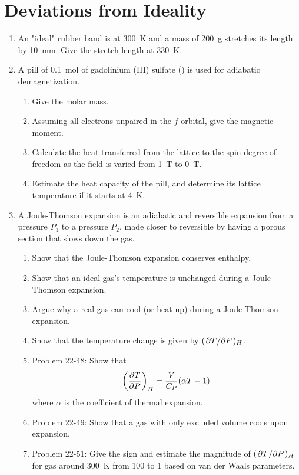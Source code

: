 \documentclass[../psets.tex]{subfiles}
\begin{document}
\section{Deviations from Ideality}
\begin{enumerate}
    \item {}An "ideal" rubber band is at \SI{300}{\kelvin} and a mass of \SI{200}{\gram} stretches its length by \SI{10}{\milli\meter}. Give the stretch length at \SI{330}{\kelvin}.
    \item A pill of \SI{0.1}{\mole} of gadolinium (III) sulfate () is used for adiabatic demagnetization.
    \begin{enumerate}
        \item Give the molar mass.
        \item Assuming all electrons unpaired in the $f$ orbital, give the magnetic moment.
        \item Calculate the heat transferred from the lattice to the spin degree of freedom as the field is varied from \SI{1}{\tesla} to \SI{0}{\tesla}.
        \item Estimate the heat capacity of the pill, and determine its lattice temperature if it starts at \SI{4}{\kelvin}.
    \end{enumerate}
    \item A Joule-Thomson expansion is an adiabatic and reversible expansion from a pressure $P_1$ to a pressure $P_2$, made closer to reversible by having a porous section that slows down the gas.
    \begin{enumerate}
        \item Show that the Joule-Thomson expansion conserves enthalpy.
        \item Show that an ideal gas's temperature is unchanged during a Joule-Thomson expansion.
        \item Argue why a real gas can cool (or heat up) during a Joule-Thomson expansion.
        \item Show that the temperature change is given by $(\pdv*{T}{P})_H$.
        \item Problem 22-48: Show that
        \begin{equation*}
            \left( \pdv{T}{P} \right)_H = \frac{V}{C_P}(\alpha T-1)
        \end{equation*}
        where $\alpha$ is the coefficient of thermal expansion.
        \item Problem 22-49: Show that a gas with only excluded volume cools upon expansion.
        \item Problem 22-51: Give the sign and estimate the magnitude of $(\pdv*{T}{P})_H$ for  gas around \SI{300}{\kelvin} from \SI{100}{\atmosphere} to \SI{1}{\atmosphere} based on van der Waals parameters.
    \end{enumerate}
\end{enumerate}
\end{document}

